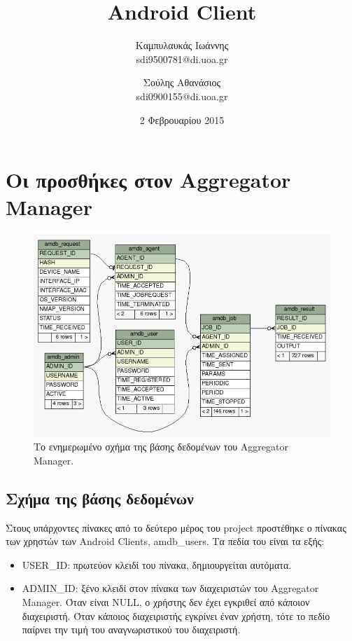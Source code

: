 \documentclass[a4paper,11pt]{article}
\title{Android Client}
\author{Καμπυλαυκάς Ιωάννης \\ sdi9500781@di.uoa.gr \and Σούλης Αθανάσιος \\ sdi0900155@di.uoa.gr}
\date{2 Φεβρουαρίου 2015}
\begin{document}
\begin{sloppypar}

\maketitle

\tableofcontents

\newpage


\section{Οι προσθήκες στον Aggregator Manager}



\begin{figure}[h]
\includegraphics[width=\textwidth]{schema}
\centering
\caption{Το ενημερωμένο σχήμα της βάσης δεδομένων του Aggregator Manager.}
\end{figure}


\subsection{Σχήμα της βάσης δεδομένων}

Στους υπάρχοντες πίνακες από το δεύτερο μέρος του project προστέθηκε ο πίνακας των χρηστών των Android Clients, amdb\_users. Τα πεδία του είναι τα εξής:

\begin{itemize}

\item USER\_ID: πρωτεύον κλειδί του πίνακα, δημιουργείται αυτόματα.

\item ADMIN\_ID: ξένο κλειδί στον πίνακα των διαχειριστών του Aggregator Manager. Όταν είναι NULL, ο χρήστης δεν έχει εγκριθεί από κάποιον διαχειριστή. Όταν κάποιος διαχειριστής εγκρίνει έναν χρήστη, τότε το πεδίο παίρνει την τιμή του αναγνωριστικού του διαχειριστή.


\end{itemize}
\end{sloppypar}
\end{document}
